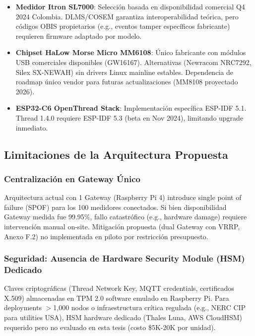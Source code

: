 \begin{itemize}
    \item \textbf{Medidor Itron SL7000}: Selección basada en disponibilidad comercial Q4 2024 Colombia. DLMS/COSEM garantiza interoperabilidad teórica, pero códigos OBIS propietarios (e.g., eventos tamper específicos fabricante) requieren firmware adaptado por modelo.
    
    \item \textbf{Chipset HaLow Morse Micro MM6108}: Único fabricante con módulos USB comerciales disponibles (GW16167). Alternativas (Newracom NRC7292, Silex SX-NEWAH) sin drivers Linux mainline estables. Dependencia de roadmap único vendor para futuras actualizaciones (MM8108 proyectado 2026).
    
    \item \textbf{ESP32-C6 OpenThread Stack}: Implementación específica ESP-IDF 5.1. Thread 1.4.0 requiere ESP-IDF 5.3 (beta en Nov 2024), limitando upgrade inmediato.
\end{itemize}

\subsection{Limitaciones de la Arquitectura Propuesta}

\subsubsection{Centralización en Gateway Único}

Arquitectura actual con 1 Gateway (Raspberry Pi 4) introduce single point of failure (SPOF) para los 100 medidores conectados. Si bien disponibilidad Gateway medida fue 99.95\%, fallo catastrófico (e.g., hardware damage) requiere intervención manual on-site. Mitigación propuesta (dual Gateway con VRRP, Anexo F.2) no implementada en piloto por restricción presupuesto.

\subsubsection{Seguridad: Ausencia de Hardware Security Module (HSM) Dedicado}

Claves criptográficas (Thread Network Key, MQTT credentials, certificados X.509) almacenadas en TPM 2.0 software emulado en Raspberry Pi. Para deployments $>$1,000 nodos o infraestructura crítica regulada (e.g., NERC CIP para utilities USA), HSM hardware dedicado (Thales Luna, AWS CloudHSM) requerido pero no evaluado en esta tesis (costo \$5K-20K por unidad).

